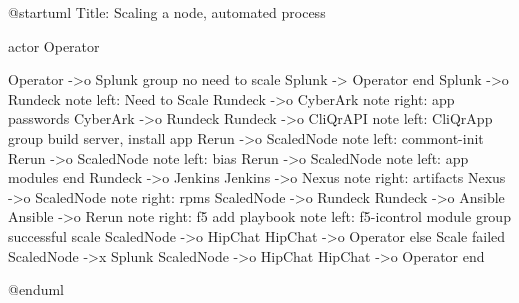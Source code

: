 @startuml
Title: Scaling a node, automated process

actor Operator


Operator ->o Splunk
group no need to scale
  Splunk -> Operator
end
Splunk ->o Rundeck
note left: Need to Scale
Rundeck ->o CyberArk
note right: app passwords
CyberArk ->o Rundeck
Rundeck ->o CliQrAPI
note left: CliQrApp
group build server, install app
  Rerun ->o ScaledNode
  note left: commont-init
  Rerun ->o ScaledNode
  note left: bias
  Rerun ->o ScaledNode
  note left: app modules
end
Rundeck ->o Jenkins
Jenkins ->o Nexus
note right: artifacts
Nexus ->o ScaledNode
note right: rpms
ScaledNode ->o Rundeck
Rundeck ->o Ansible
Ansible ->o Rerun
note right: f5 add playbook
note left: f5-icontrol module
group successful scale
  ScaledNode ->o HipChat
  HipChat ->o Operator
else Scale failed
  ScaledNode ->x Splunk
  ScaledNode ->o HipChat
  HipChat ->o Operator
end




@enduml
